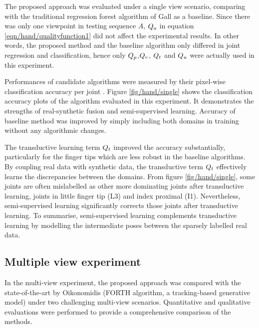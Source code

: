 The proposed approach was evaluated under a single view scenario, comparing with the traditional regression forest algorithm of Gall \etal \cite{Gall2011} as a baseline. Since there was only one viewpoint in testing sequence $A$, $Q_{a}$ in equation \ref{eqn/hand/qualityfunction1} did not affect the experimental results. In other words, the proposed method and the baseline algorithm only differed in joint regression and classification, hence only $Q_{p}$,$Q_{v}$, $Q_{t}$ and $Q_{u}$ were actually used in this experiment.    

Performances of candidate algorithms were measured by their pixel-wise classification accuracy per joint \cite{Shotton2011}. Figure \ref{fig/hand/single} shows the classification accuracy plots of the algorithm evaluated in this experiment.  
It demonstrates the strengths of real-synthetic fusion and semi-supervised learning. 
Accuracy of baseline method was improved by simply including both domains in training without any algorithmic changes. 

The transductive learning term $Q_{t}$ improved the accuracy substantially, particularly for the finger tips which are less robust in the baseline algorithms.  
By coupling real data with synthetic data, the transductive term $Q_{t}$ effectively learns the discrepancies between the domains.
From figure \ref{fig/hand/single}, some joints are often mislabelled as other more dominating joints after transductive learning, \eg joints in little finger tip (L3) and index proximal (I1). 
Nevertheless, semi-supervised learning significantly corrects those joints after transductive learning. To summarise, semi-supervised learning complements transductive learning by modelling the intermediate poses between the sparsely labelled real data.    


\subsection{Multiple view experiment}  

In the multi-view experiment, the proposed approach was compared with the state-of-the-art by Oikonomidis \etal (FORTH algorithm, a tracking-based generative model) \cite{Oikonomidis2011} under two challenging multi-view scenarios. Quantitative and qualitative evaluations were performed to provide a comprehensive comparison of the methods. 

